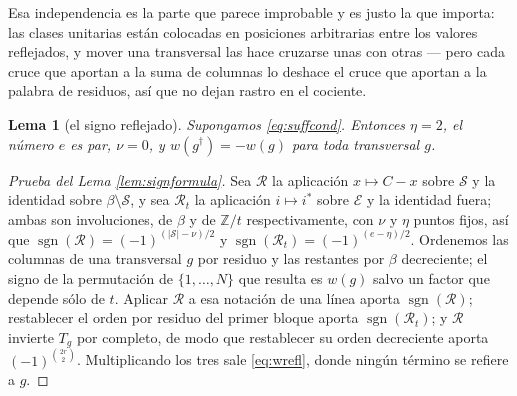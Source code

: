 \documentclass[11pt,reqno]{amsart}
\theoremstyle{plain}
\newtheorem{lemma}[theorem]{Lema}
\theoremstyle{definition}
\newcommand{\ZZ}{\mathbb{Z}}
\newcommand{\sgn}{\operatorname{sgn}}
\begin{document}
\noindent Esa independencia es la parte que parece improbable y es justo la que importa: las clases
unitarias están colocadas en posiciones arbitrarias entre los valores reflejados, y mover una
transversal las hace cruzarse unas con otras --- pero cada cruce que aportan a la suma de columnas lo
deshace el cruce que aportan a la palabra de residuos, así que no dejan rastro en el cociente.

\begin{lemma}[el signo reflejado]\label{lem:signrefl}
Supongamos \eqref{eq:suffcond}. Entonces $\eta=2$, el número $e$ es par, $\nu=0$, y
$w(g^{\dagger})=-w(g)$ para toda transversal $g$.
\end{lemma}

\begin{proof}[Prueba del Lema \ref{lem:signformula}]
Sea $\mathcal{R}$ la aplicación $x\mapsto C-x$ sobre $\mathcal{S}$ y la identidad sobre
$\beta\setminus\mathcal{S}$, y sea $\mathcal{R}_t$ la aplicación $i\mapsto i^{*}$ sobre $\mathcal{E}$
y la identidad fuera; ambas son involuciones, de $\beta$ y de $\ZZ/t$ respectivamente, con $\nu$ y
$\eta$ puntos fijos, así que $\sgn(\mathcal{R})=(-1)^{(|\mathcal{S}|-\nu)/2}$ y
$\sgn(\mathcal{R}_t)=(-1)^{(e-\eta)/2}$. Ordenemos las columnas de una transversal $g$ por residuo y
las restantes por $\beta$ decreciente; el signo de la permutación de $\{1,\dots,N\}$ que resulta es
$w(g)$ salvo un factor que depende sólo de $t$. Aplicar $\mathcal{R}$ a esa notación de una línea
aporta $\sgn(\mathcal{R})$; restablecer el orden por residuo del primer bloque aporta
$\sgn(\mathcal{R}_t)$; y $\mathcal{R}$ invierte $T_g$ por completo, de modo que restablecer su orden
decreciente aporta $(-1)^{\binom{2r}{2}}$. Multiplicando los tres sale \eqref{eq:wrefl}, donde ningún
término se refiere a $g$.
\end{proof}
\end{document}
